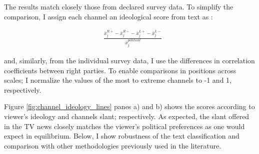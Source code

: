 \documentclass[12pt]{article}
\begin{document}
	The results match closely those from declared survey data. 	To simplify the comparison, I assign each channel an ideological score from text as :
	
	\begin{equation}
		\begin{aligned}
			& \frac{\bar{x}_j^{R+}-\bar{x}_j^{R-}-\bar{x}_j^{L+}-\bar{x}_j^{L-}}{\bar{x}_j^{political}}
		\end{aligned}
		\label{eq:position}
	\end{equation} 
	
	
	and, similarly, from the individual survey data, I use the differences in correlation coefficients between right parties. To enable comparisons in positions across scales; I normalize the values of the most to extreme channels to -1 and 1, respectively. 
	
	
	Figure \ref{fig:channel_ideology_lines} panes a) and b)  shows the scores according to viewer's ideology and channels slant; respectively. As expected, the slant offered in the TV news closely matches the viewer's political preferences as one would expect in equilibrium. Below, I show robustness of the text classification and comparison with other methodologies previously used in the literature. 
	
\end{document}

